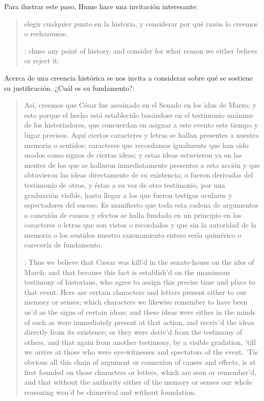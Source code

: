 Para ilustrar este paso, Hume hace una invitación interesante:
  \blockquote[{\cite[?]{humetreatise}}: chuse any point of history, and consider
  for what reason we either believe or reject it.]{elegir cualquier punto en la
    historia, y considerar por qué razón lo creemos o rechazamos.} Acerca de una
  creencia histórica se nos invita a considerar sobre qué se sostiene su
  justificación. ¿Cuál es su fundamento?:
  \blockquote[{\cite[?]{humetratise}}: Thus we believe that Cæsar was kill’d in
  the senate-house on the ides of March; and that because this fact is establish’d
  on the unanimous testimony of historians, who agree to assign this precise time
  and place to that event. Here are certain characters and letters present either
  to our memory or senses; which characters we likewise remember to have been us’d
  as the signs of certain ideas; and these ideas were either in the minds of such
  as were immediately present at that action, and receiv’d the ideas directly from
  its existence; or they were deriv’d from the testimony of others, and that again
  from another testimony, by a visible gradation, ’till we arrive at those who
  were eye-witnesses and spectators of the event. ’Tis obvious all this chain of
  argument or connexion of causes and effects, is at first founded on those
  characters or letters, which are seen or remember’d, and that without the
  authority either of the memory or senses our whole reasoning wou’d be chimerical
  and without foundation.]{Así, creemos que César fue asesinado en el Senado en
    los idus de Marzo; y esto porque el hecho está establecido basándose en el
    testimonio unánime de los historiadores, que concuerdan en asignar a este
    evento este tiempo y lugar precisos. Aquí ciertos caracteres y letras se
    hallan presentes a nuestra memoria o sentidos; caracteres que recordamos
    igualmente que han sido usados como signos de ciertas ideas; y estas ideas
    estuvieron ya en las mentes de los que se hallaron inmediatamente presentes a
    esta acción y que obtuvieron las ideas directamente de su existencia; o fueron
    derivadas del testimonio de otros, y éstas a su vez de otro testimonio, por
    una graduación visible, hasta llegar a los que fueron testigos oculares y
    espectadores del suceso. Es manifiesto que toda esta cadena de argumentos o
    conexión de causas y efectos se halla fundada en un principio en los
    caracteres o letras que son vistos o recordados y que sin la autoridad de la
    memoria o los sentidos nuestro razonamiento entero sería quimérico o carecería
    de fundamento.}


